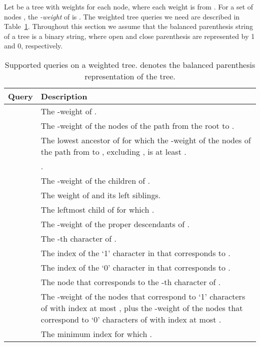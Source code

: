 \documentclass[12pt]{article}
\begin{document}
Let  be a tree with weights  for each node,
where each weight is from .
For a set of nodes , the \emph{-weight} of  is
.
The weighted tree queries we need are described in
Table~\ref{tab:weight-queries}. Throughout this section we assume that the balanced
parenthesis string of a tree is a binary string, where open and close parenthesis are
represented by 1 and 0, respectively.

\begin{table}
\caption{Supported queries on a weighted tree.
 denotes the balanced parenthesis representation of the tree.
\label{tab:weight-queries}}
\centering
\begin{tabular}{lp{11.4cm}}
\toprule
Query & Description \\
\midrule
 & The -weight of . \\
 & The -weight of the nodes of the path from the root
			to . \\
 & The lowest ancestor  of  for which
			the -weight of the nodes of the path from  to ,
			excluding , is at least .\\
 &  .\\
 & The -weight of the children of . \\
 & The  weight of  and its left siblings. \\
 & The leftmost child  of  for which
			. \\
 & The -weight of the proper descendants of . \\
 & The -th character of . \\
 & The index of the `1' character in  that corresponds
			to . \\
 & The index of the `0' character in  that corresponds
			to . \\
 & The node that corresponds to the -th character of . \\
 & The -weight of the nodes that correspond
			to `1' characters of  with index at most ,
			plus the -weight of the nodes that correspond
			to `0' characters of  with index at most . \\
 & The minimum index  for which 
			. \\
\bottomrule
\end{tabular}
\end{table}
\end{document}
